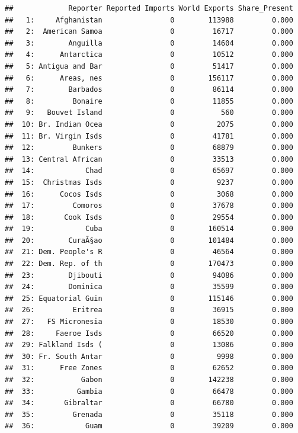 \documentclass[10pt,]{article}
\begin{document}
\begin{verbatim}
##             Reporter Reported Imports World Exports Share_Present
##   1:     Afghanistan                0        113988         0.000
##   2:  American Samoa                0         16717         0.000
##   3:        Anguilla                0         14604         0.000
##   4:      Antarctica                0         10512         0.000
##   5: Antigua and Bar                0         51417         0.000
##   6:      Areas, nes                0        156117         0.000
##   7:        Barbados                0         86114         0.000
##   8:         Bonaire                0         11855         0.000
##   9:   Bouvet Island                0           560         0.000
##  10: Br. Indian Ocea                0          2075         0.000
##  11: Br. Virgin Isds                0         41781         0.000
##  12:         Bunkers                0         68879         0.000
##  13: Central African                0         33513         0.000
##  14:            Chad                0         65697         0.000
##  15:  Christmas Isds                0          9237         0.000
##  16:      Cocos Isds                0          3068         0.000
##  17:         Comoros                0         37678         0.000
##  18:       Cook Isds                0         29554         0.000
##  19:            Cuba                0        160514         0.000
##  20:        CuraÃ§ao                0        101484         0.000
##  21: Dem. People's R                0         46564         0.000
##  22: Dem. Rep. of th                0        170473         0.000
##  23:        Djibouti                0         94086         0.000
##  24:        Dominica                0         35599         0.000
##  25: Equatorial Guin                0        115146         0.000
##  26:         Eritrea                0         36915         0.000
##  27:   FS Micronesia                0         18530         0.000
##  28:     Faeroe Isds                0         66520         0.000
##  29: Falkland Isds (                0         13086         0.000
##  30: Fr. South Antar                0          9998         0.000
##  31:      Free Zones                0         62652         0.000
##  32:           Gabon                0        142238         0.000
##  33:          Gambia                0         66478         0.000
##  34:       Gibraltar                0         66780         0.000
##  35:         Grenada                0         35118         0.000
##  36:            Guam                0         39209         0.000

\end{verbatim}
\end{document}
